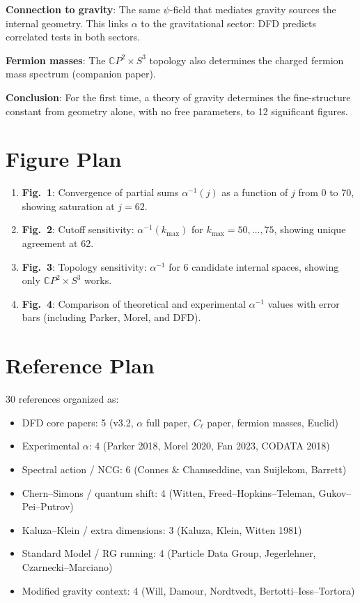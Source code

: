 \documentclass[11pt,a4paper]{article}
\newcommand{\CP}{\mathbb{C}P}
\begin{document}
\textbf{Connection to gravity}: The same $\psi$-field that mediates gravity sources the internal geometry. This links $\alpha$ to the gravitational sector: DFD predicts correlated tests in both sectors.

\textbf{Fermion masses}: The $\CP^2 \times S^3$ topology also determines the charged fermion mass spectrum (companion paper).

\textbf{Conclusion}: For the first time, a theory of gravity determines the fine-structure constant from geometry alone, with no free parameters, to 12 significant figures.

\section{Figure Plan}

\begin{enumerate}
\item \textbf{Fig.\ 1}: Convergence of partial sums $\alpha^{-1}(j)$ as a function of $j$ from 0 to 70, showing saturation at $j = 62$.
\item \textbf{Fig.\ 2}: Cutoff sensitivity: $\alpha^{-1}(k_{\max})$ for $k_{\max} = 50, \ldots, 75$, showing unique agreement at 62.
\item \textbf{Fig.\ 3}: Topology sensitivity: $\alpha^{-1}$ for 6 candidate internal spaces, showing only $\CP^2 \times S^3$ works.
\item \textbf{Fig.\ 4}: Comparison of theoretical and experimental $\alpha^{-1}$ values with error bars (including Parker, Morel, and DFD).
\end{enumerate}

\section{Reference Plan}

30 references organized as:
\begin{itemize}
\item DFD core papers: 5 (v3.2, $\alpha$ full paper, $C_\ell$ paper, fermion masses, Euclid)
\item Experimental $\alpha$: 4 (Parker 2018, Morel 2020, Fan 2023, CODATA 2018)
\item Spectral action / NCG: 6 (Connes \& Chamseddine, van Suijlekom, Barrett)
\item Chern--Simons / quantum shift: 4 (Witten, Freed--Hopkins--Teleman, Gukov--Pei--Putrov)
\item Kaluza--Klein / extra dimensions: 3 (Kaluza, Klein, Witten 1981)
\item Standard Model / RG running: 4 (Particle Data Group, Jegerlehner, Czarnecki--Marciano)
\item Modified gravity context: 4 (Will, Damour, Nordtvedt, Bertotti--Iess--Tortora)
\end{itemize}
\end{document}
